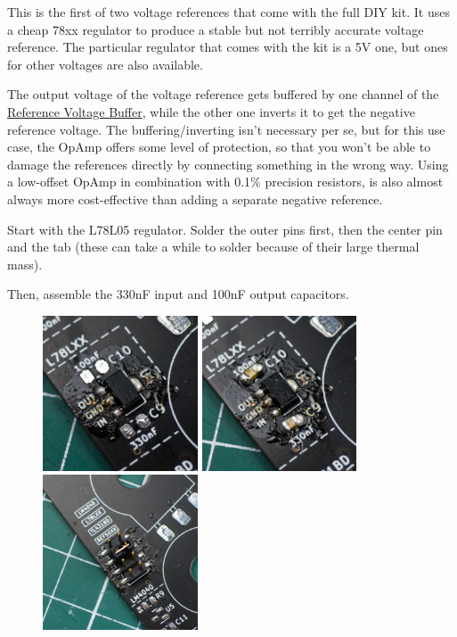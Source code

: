 \documentclass[12pt, a4paper]{article}
\begin{document}
This is the first of two voltage references that come with the full DIY kit. It uses a cheap
78xx regulator to produce a stable but not terribly accurate voltage reference. The particular
regulator that comes with the kit is a 5V one, but ones for other voltages are also available.

The output voltage of the voltage reference gets buffered by one channel of the
\hyperref[sec:reference_voltage_buffer]{Reference Voltage Buffer}, while the other one inverts
it to get the negative reference voltage. The buffering/inverting isn't necessary per se, but
for this use case, the OpAmp offers some level of protection, so that you won't be able to
damage the references directly by connecting something in the wrong way. Using a low-offset
OpAmp in combination with 0.1\% precision resistors, is also almost always more cost-effective
than adding a separate negative reference.

Start with the L78L05 regulator. Solder the outer pins first, then the center pin and the tab
(these can take a while to solder because of their large thermal mass).

Then, assemble the 330nF input and 100nF output capacitors.

\begin{figure}[H]
    \centering
    \includegraphics[width=46mm]{images/section_1-5_regulator.jpg}
    \hspace{2mm}
    \includegraphics[width=46mm]{images/section_1-5_capacitors.jpg}
    \hspace{2mm}
    \includegraphics[width=46mm]{images/section_1-5_header.jpg}
\end{figure}
\end{document}
